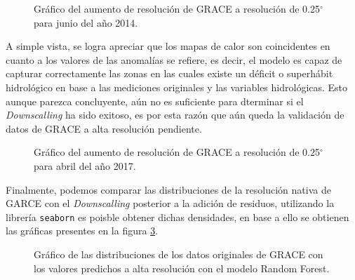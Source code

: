 \begin{figure}[H]
    \centering
          \goodgap
          \vskip -0.1in
    \caption[\textit{Downscalling} final para el mes 06/2014]{Gráfico del aumento de resolución de GRACE a resolución de 0.25$^{\circ}$ para junio del año 2014.}
    \label{dsf14}
\end{figure}

A simple vista, se logra apreciar que los mapas de calor son coincidentes en cuanto a los valores de las anomalías se refiere, es decir, el modelo es capaz de capturar correctamente
las zonas en las cuales existe un déficit o superhábit hidrológico en base a las mediciones originales y las variables hidrológicas. Esto aunque parezca concluyente, aún no es suficiente para dterminar si el \textit{Downscalling}
ha sido exitoso, es por esta razón que aún queda la validación de datos de GRACE a alta resolución pendiente.

\begin{figure}[H]
    \centering
          \goodgap
          \vskip -0.1in
    \caption[\textit{Downscalling} final para el mes 06/2014]{Gráfico del aumento de resolución de GRACE a resolución de 0.25$^{\circ}$ para abril del año 2017.}
    \label{dsf17}
\end{figure}



Finalmente, podemos comparar las distribuciones de la resolución nativa de GARCE con el \textit{Downscalling} posterior a la adición de residuos,
utilizando la librería \texttt{seaborn} es poisble obtener dichas densidades, en base a ello se obtienen las gráficas presentes en la figura \ref{distcomp}.
\begin{figure}[H]
    \centering
          \goodgap
          \vskip -0.1in
    \caption[Comparativa de distribuciones de GRACE]{Gráfico de las distribuciones de los datos originales de GRACE con los valores predichos a alta resolución con el modelo Random Forest.}
    \label{distcomp}
\end{figure}

